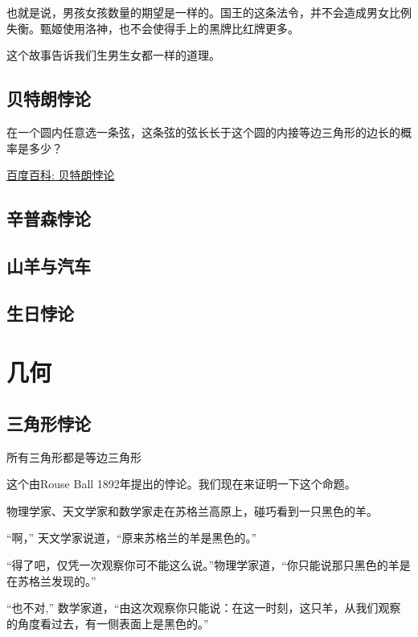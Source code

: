 \documentclass[export, 12pt, letterpaper]{ctexrep}
\newenvironment{shadedquotation}
 {\begin{shaded*}
  \quoting[leftmargin=5pt, rightmargin=5pt, vskip=0pt]
 }
 {\endquoting
 \end{shaded*}
}
\begin{document}
也就是说，男孩女孩数量的期望是一样的。国王的这条法令，并不会造成男女比例失衡。甄姬使用洛神，也不会使得手上的黑牌比红牌更多。

这个故事告诉我们生男生女都一样的道理。


\section{贝特朗悖论}
在一个圆内任意选一条弦，这条弦的弦长长于这个圆的内接等边三角形的边长的概率是多少？

\href{https://baike.baidu.com/item/\%E8\%B4\%9D\%E7\%89\%B9\%E6\%9C\%97\%E6\%82\%96\%E8\%AE\%BA}{百度百科: 贝特朗悖论}


\section{辛普森悖论}


\section{山羊与汽车}


\section{生日悖论}




\chapter{几何}


\section{三角形悖论}
\begin{shadedquotation}
\noindent
所有三角形都是等边三角形
\end{shadedquotation}


这个由Rouse Ball 1892年提出的悖论。我们现在来证明一下这个命题。

\begin{center}

\end{center}

\begin{shadedquotation}
\noindent
物理学家、天文学家和数学家走在苏格兰高原上，碰巧看到一只黑色的羊。
\noindent

\noindent
“啊，” 天文学家说道，“原来苏格兰的羊是黑色的。”
\noindent

\noindent
“得了吧，仅凭一次观察你可不能这么说。”物理学家道，“你只能说那只黑色的羊是在苏格兰发现的。”
\noindent

\noindent
“也不对,” 数学家道，“由这次观察你只能说：在这一时刻，这只羊，从我们观察的角度看过去，有一侧表面上是黑色的。”
\end{shadedquotation}
\end{document}
